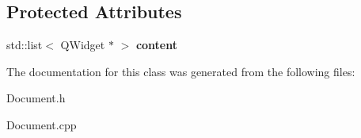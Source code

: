 \subsection*{\-Protected \-Attributes}
\begin{DoxyCompactItemize}
\item 
\hypertarget{classDocumentEditor_a2a21804611f483b627f3ed7cdaf3c793}{std\-::list$<$ \-Q\-Widget $\ast$ $>$ {\bfseries content}}\label{classDocumentEditor_a2a21804611f483b627f3ed7cdaf3c793}

\end{DoxyCompactItemize}


\-The documentation for this class was generated from the following files\-:\begin{DoxyCompactItemize}
\item 
\-Document.\-h\item 
\-Document.\-cpp\end{DoxyCompactItemize}
